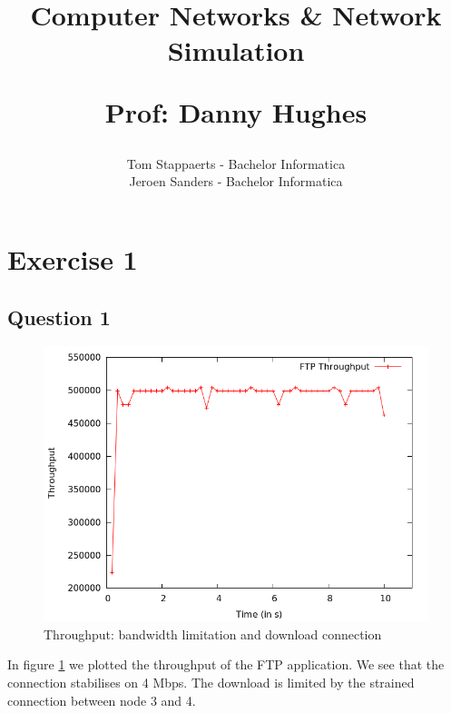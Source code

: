 \documentclass[11pt,a4paper]{article}
\author{Tom Stappaerts - Bachelor Informatica  \\ Jeroen Sanders - Bachelor Informatica}
\title{Computer Networks \& Network Simulation \\ \begin{small} Prof: Danny Hughes\end{small}}
\begin{document}
\maketitle
\newpage 

\section{Exercise 1}

\subsection{Question 1}
\begin{figure}[h!]
 \centering
 \includegraphics[width = 0.8\linewidth]{./output-ex1-part1-1.png}
 \caption{Throughput: bandwidth limitation and download connection}
 \label{fig:Q1}
\end{figure}
In figure \ref{fig:Q1} we plotted the throughput of the FTP application. We see that the connection stabilises on 4 Mbps.
The download is limited by the strained connection between node 3 and 4.
\end{document}
